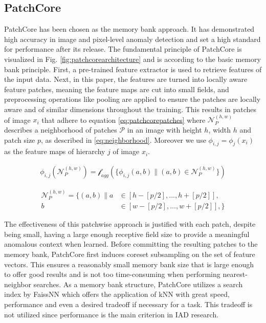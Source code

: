 \subsection{PatchCore}
\label{subsec:patchcore}
PatchCore \cite{patchCore2022} has been chosen as the memory bank approach. It has demonstrated high accuracy in image and pixel-level anomaly detection and set a high standard for 
performance after its release. The fundamental principle of PatchCore is visualized in Fig. \ref{fig:patchcorearchitecture} and is according to the basic memory bank principle. First, a pre-trained feature extractor is used 
to retrieve features of the input data. Next, in this paper, the features are turned into locally aware feature patches, meaning the feature maps are cut into small fields, and preprocessing operations like pooling are applied to ensure 
the patches are locally aware and of similar dimensions throughout the training. This results in patches of image $x_i$ that adhere to equation \ref{eq:patchcorepatches} where $\mathcal{N}_{P}^{(h,w)}$ 
describes a neighborhood of patches $\mathcal{P}$ in an image with height $h$, width $h$ and patch size $p$, as described in \ref{eq:neighborhood}. Moreover we use $\phi_{i,j} = \phi_j(x_i)$ as the feature 
maps of hierarchy $j$ of image $x_i$.

\begin{equation}
\label{eq:patchcorepatches}
\begin{split}
\phi_{i,j} (\mathcal{N}_{P}^{(h,w)}) = \mathcal{f}_{agg}(\{ \phi_{i,j}(a,b) \| (a,b) \in \mathcal{N}_{P}^{(h,w)} \})
\end{split}
\end{equation}

\begin{equation}
 \label{eq:neighborhood}
 \begin{split}
\mathcal{N}_{P}^{(h,w)} = \{ (a,b) \| a & \in [h - [p/2], ..., h + [p/2]], \\
 b & \in [w - [p/2], ..., w + [p/2]], \}
 \end{split}
\end{equation}

The effectiveness of this patchwise approach is justified with each patch, despite being small, having a large enough receptive field size to provide a meaningful anomalous context when learned. 
Before committing the resulting patches to the memory bank, PatchCore first induces coreset subsampling on the set of feature vectors. This ensures a reasonably small memory bank size that is 
large enough to offer good results and is not too time-consuming when performing nearest-neighbor searches. As a memory bank structure, PatchCore utilizes a search index by FaissNN \cite{douze2024faissnn}
which offers the application of kNN with great speed, performance and even a desired tradeoff if necessary for a task. This tradeoff is not utilized since performance is the main criterion in IAD research. 

